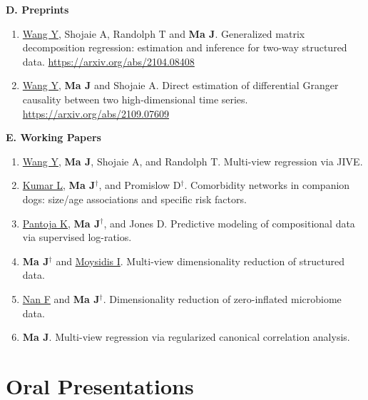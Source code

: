 \documentclass[10pt]{article}
\begin{document}
\textbf{D.  Preprints}
\begin{enumerate}
\item \underline{Wang Y}, Shojaie A, Randolph T and \textbf{Ma J}. Generalized matrix decomposition regression: estimation and inference for two-way structured data. \url{https://arxiv.org/abs/2104.08408}
\item \underline{Wang Y}, \textbf{Ma J} and Shojaie A. Direct estimation of differential Granger causality between two high-dimensional time series.  \url{https://arxiv.org/abs/2109.07609}
\end{enumerate}

\textbf{E. Working Papers}
\begin{enumerate}\setcounter{enumi}{0}
\item \underline{Wang Y}, \textbf{Ma J}, Shojaie A, and Randolph T. Multi-view regression via JIVE. 
\item \underline{Kumar L}, \textbf{Ma J}$^{\dagger}$, and Promislow D$^{\dagger}$. Comorbidity networks in companion dogs: size/age associations and specific risk factors. 
\item \underline{Pantoja K}, \textbf{Ma J}$^{\dagger}$, and Jones D. Predictive modeling of compositional data via supervised log-ratios.
\item \textbf{Ma J}$^{\dagger}$ and \underline{Moysidis I}. Multi-view dimensionality reduction of structured data. 
\item \underline{Nan F} and \textbf{Ma J}$^{\dagger}$. Dimensionality reduction of zero-inflated microbiome data. 
\item \textbf{Ma J}. Multi-view regression via regularized canonical correlation analysis. 
\end{enumerate}


\section*{Oral Presentations}
\end{document}
